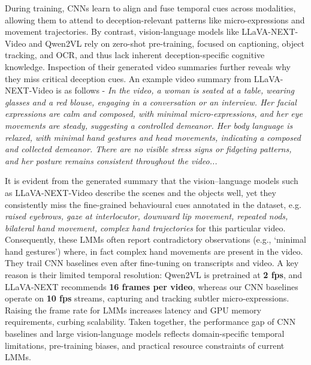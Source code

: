 During training, CNNs learn to align and fuse temporal cues across modalities, allowing them to attend to deception-relevant patterns like micro-expressions and movement trajectories. By contrast, vision-language models like LLaVA-NEXT-Video and Qwen2VL rely on zero-shot pre-training, focused on captioning, object tracking, and OCR, and thus lack inherent deception-specific cognitive knowledge. Inspection of their generated video summaries further reveals why they miss critical deception cues. An example video summary from LLaVA-NEXT-Video is as follows - \textit{In the video, a woman is seated at a table, wearing glasses and a red blouse, engaging in a conversation or an interview. Her facial expressions are calm and composed, with minimal micro-expressions, and her eye movements are steady, suggesting a controlled demeanor. Her body language is relaxed, with minimal hand gestures and head movements, indicating a composed and collected demeanor. There are no visible stress signs or fidgeting patterns, and her posture remains consistent throughout the video...}

It is evident from the generated summary that the vision–language models such as LLaVA-NEXT-Video describe the scenes and the objects well, yet they consistently miss the fine-grained behavioural cues annotated in the dataset, e.g. \textit{raised eyebrows, gaze at interlocutor, downward lip movement, repeated nods, bilateral hand movement, complex hand trajectories} for this particular video. Consequently, these LMMs often report contradictory observations (e.g., `minimal hand gestures') where, in fact complex hand movements are present in the video. They trail CNN baselines even after fine-tuning on transcripts and video. A key reason is their limited temporal resolution: Qwen2VL is pretrained at \textbf{2 fps}, and LLaVA-NEXT recommends \textbf{16 frames per video}, whereas our CNN baselines operate on \textbf{10 fps} streams, capturing and tracking subtler micro-expressions. Raising the frame rate for LMMs increases latency and GPU memory requirements, curbing scalability. Taken together, the performance gap of CNN baselines and large vision-language models reflects domain-specific temporal limitations, pre-training biases, and practical resource constraints of current LMMs.

